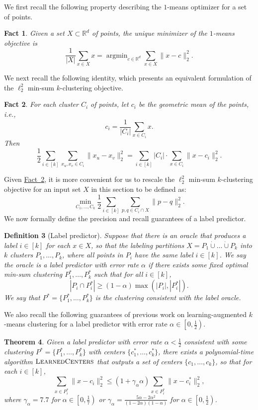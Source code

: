 \documentclass[10pt,a4paper]{amsart}
\newtheorem{theorem}{Theorem}[section]
\newtheorem{definition}[theorem]{Definition}
\newtheorem{fact}[theorem]{Fact}
\newcommand{\namedref}[2]{\hyperref[#2]{#1~\ref*{#2}}}
\newcommand{\thmlab}[1]{\label{thm:#1}}
\newcommand{\factlab}[1]{\label{fact:#1}}
\newcommand{\factref}[1]{\namedref{Fact}{fact:#1}}
\newcommand{\deflab}[1]{\label{def:#1}}
\def \LearnedCenters    {\mdef{\textsc{LearnedCenters}}}
\newcommand{\mdef}[1]{{\ensuremath{#1}}\xspace}  %
\DeclareMathOperator*{\argmin}{argmin}
\begin{document}
We first recall the following property describing the $1$-means optimizer for a set of points. 
\begin{fact}
\factlab{fact:means:center}
\cite{InabaKI94}
Given a set $X\subset\mathbb{R}^d$ of points, the unique minimizer of the $1$-means objective is 
\[\frac{1}{|X|}\sum_{x\in X}x=\argmin_{c\in\mathbb{R}^d}\sum_{x\in X}\|x-c\|_2^2.\]
\end{fact}
We next recall the following identity, which presents an equivalent formulation of the $\ell_2^2$ min-sum $k$-clustering objective. 
\begin{fact}
\cite{InabaKI94}
\factlab{fact:minsum}
For each cluster $C_i$ of points, let $c_i$ be the geometric mean of the points, i.e., 
\[c_i=\frac{1}{|C_i|}\sum_{x\in C_i} x.\]
Then
\[\frac{1}{2}\sum_{i\in[k]}\sum_{x_u,x_v\in C_i}\|x_u-x_v\|_2^2=\sum_{i\in[k]}|C_i|\cdot\sum_{x\in C_i}\|x-c_i\|_2^2.\]
\end{fact}
Given \factref{fact:minsum}, it is more convenient for us to rescale the $\ell_2^2$ min-sum $k$-clustering objective for an input set $X$ in this section to be defined as:
\[\min_{C_1,\ldots,C_k}\frac{1}{2}\sum_{i\in[k]}\sum_{p,q\in C_i\cap X}\|p-q\|_2^2.\]
We now formally define the precision and recall guarantees of a label predictor. 
\begin{definition}[Label predictor]
\deflab{def:label:oracle}
Suppose that there is an oracle that produces a label $i\in[k]$ for each $x\in X$, so that the labeling partitions $X=P_1\dot\cup\ldots\dot\cup P_k$ into $k$ clusters $P_1,\ldots,P_k$, where all points in $P_i$ have the same label $i\in[k]$. 
We say the oracle is a \emph{label predictor with error rate} $\alpha$ if there exists some fixed optimal min-sum clustering $P^*_1,\ldots,P^*_k$ such that for all $i\in[k]$,
\[|P_i\cap P^*_i|\ge(1-\alpha)\max(|P_i|,|P^*_i|).\]
We say that $P^*=\{P^*_1,\ldots,P^*_k\}$ is the clustering consistent with the label oracle. 
\end{definition}
We also recall the following guarantees of previous work on learning-augmented $k$-means clustering for a label predictor with error rate $\alpha\in\left[0,\frac{1}{2}\right)$. 
\begin{theorem}
\cite{NguyenCN23}
\thmlab{thm:each:cluster}
Given a label predictor with error rate $\alpha<\frac{1}{2}$ consistent with some clustering $P^*=\{P^*_1,\ldots,P^*_k\}$ with centers $\{c^*_1,\ldots,c^*_k\}$, there exists a polynomial-time algorithm $\LearnedCenters$ that outputs a set of centers $\{c_1,\ldots,c_k\}$, so that for each $i\in[k]$,
\[\sum_{x\in P^*_i}\|x-c_i\|_2^2\le(1+\gamma_\alpha\alpha)\sum_{x\in P^*_i}\|x-c^*_i\|_2^2,\]
where $\gamma_\alpha=7.7$ for $\alpha\in\left[0,\frac{1}{7}\right)$ or $\gamma_\alpha=\frac{5\alpha-2\alpha^2}{(1-2\alpha)(1-\alpha)}$ for $\alpha\in\left[0,\frac{1}{2}\right)$. 
\end{theorem}
\end{document}
